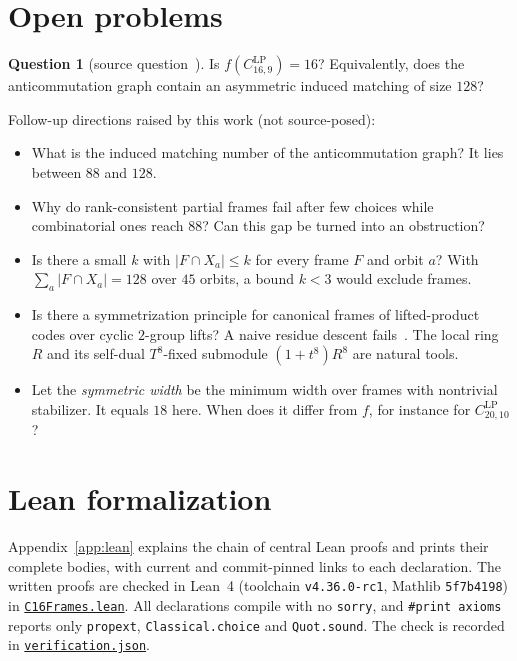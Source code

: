 \documentclass[11pt]{article}
\theoremstyle{definition}
\newtheorem{question}[theorem]{Question}
\theoremstyle{remark}
\newcommand{\CLP}{C^{\mathrm{LP}}_{16,9}}
\newcommand{\repourl}{https://github.com/alectionary/vibe-math}
\newcommand{\leanfile}{formalization/canonical-width/c16/lean/C16Frames.lean}
\begin{document}
\section{Open problems}\label{sec:open}

\begin{question}[source question~\cite{lee}]
Is $f(\CLP)=16$? Equivalently, does the anticommutation graph contain an asymmetric induced matching of size $128$?
\end{question}

Follow-up directions raised by this work (not source-posed):
\begin{itemize}
\item What is the induced matching number of the anticommutation graph? It lies between $88$ and $128$.
\item Why do rank-consistent partial frames fail after few choices while combinatorial ones reach $88$? Can this gap be turned into an obstruction?
\item Is there a small $k$ with $|F\cap X_a|\le k$ for every frame $F$ and orbit $a$? With $\sum_a|F\cap X_a|=128$ over $45$ orbits, a bound $k<3$ would exclude frames.
\item Is there a symmetrization principle for canonical frames of lifted-product codes over cyclic $2$-group lifts? A naive residue descent fails~\cite{inverse4h}. The local ring $R$ and its self-dual $T^8$-fixed submodule $(1+t^8)R^8$ are natural tools.
\item Let the \emph{symmetric width} be the minimum width over frames with nontrivial stabilizer. It equals $18$ here. When does it differ from $f$, for instance for $C^{\mathrm{LP}}_{20,10}$?
\end{itemize}

\section{Lean formalization}\label{sec:lean}
Appendix~\ref{app:lean} explains the chain of central Lean proofs and prints their complete bodies, with current and commit-pinned links to each declaration. The written proofs are checked in Lean~4 (toolchain \texttt{v4.36.0-rc1}, Mathlib \texttt{5f7b4198}) in \href{\repourl/blob/master/\leanfile}{\texttt{C16Frames.lean}}. All declarations compile with no \texttt{sorry}, and \texttt{\#print axioms} reports only \texttt{propext}, \texttt{Classical.choice} and \texttt{Quot.sound}. The check is recorded in \href{\repourl/blob/master/formalization/canonical-width/c16/lean/verification.json}{\texttt{verification.json}}.
\end{document}
